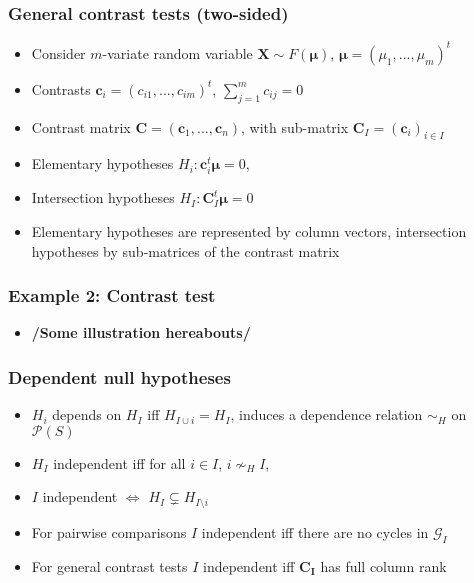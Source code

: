 \documentclass[bigger]{beamer}
\newcommand{\bs}[1]{\bm{#1}}
\begin{document}
\begin{frame}
\frametitle{General contrast tests (two-sided)}
\begin{itemize}

\item Consider $m$-variate random variable $\bs{X} \sim F(\bs{\mu})$, $\bs{\mu} = (\mu_1,...,\mu_m)^t$

\item Contrasts $\bs{c}_i = (c_{i1},...,c_{im})^t$, $\sum_{j = 1}^m
  c_{ij} = 0$
\item Contrast matrix  $\bs{C} = \left( \bs{c}_1,...,\bs{c}_n\right)$,
  with sub-matrix $\bs{C}_I = \left( \bs{c}_i \right)_{i \in
    I}$
\item Elementary hypotheses $H_i: \bs{c}_i^t\bs{\mu} = 0$,
\item Intersection hypotheses $H_I: \bs{C}_I^t\bs{\mu} = 0$

\item Elementary hypotheses are represented by column vectors,
  intersection hypotheses by sub-matrices of the contrast matrix

\end{itemize} %
\end{frame}



\begin{frame}
\frametitle{Example 2: Contrast test}
\begin{itemize}

\item \textbf{/Some illustration hereabouts/}

\end{itemize} %
\end{frame}



\begin{frame}
\frametitle{Dependent null hypotheses}

\begin{itemize}
\item $H_i$ depends on $H_I$ iff $H_{I \cup i} = H_{I}$, induces a
  dependence relation $\sim_H$ on $\mathcal{P}(S)$
\item $H_I$ independent iff for all $i \in I$, $i \nsim_H I$,
\item $I$ independent $\Leftrightarrow$ $H_{I} \subsetneq  H_{I\setminus i}$
\item For pairwise comparisons $I$ independent iff there are no cycles in $\mathscr{G}_I$
\item For general contrast tests $I$ independent iff $\bs{C_I}$ has full
  column rank
\end{itemize} %
\end{frame}
\end{document}
